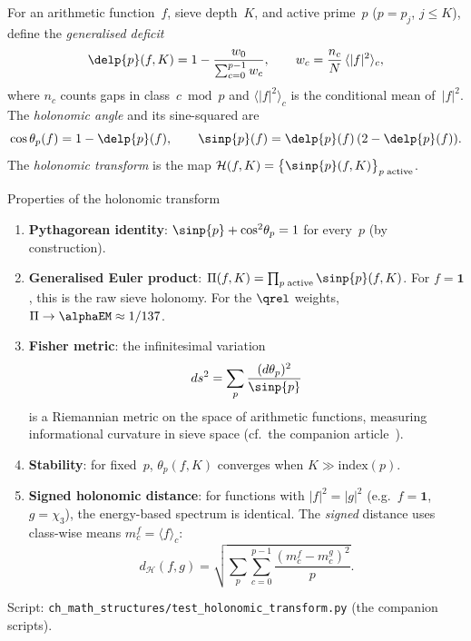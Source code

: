 \documentclass[12pt,a4paper]{article}
\begin{document}
\begin{definition}
\label{def:holonomic_transform}
For an arithmetic function~$f$, sieve depth~$K$, and active
prime~$p$ ($p = p_j$, $j \leq K$), define the \emph{generalised
deficit}
\begin{equation}
  \delp{p}(f,K) = 1 - \frac{w_0}{\sum_{c=0}^{p-1} w_c},
  \qquad
  w_c = \frac{n_c}{N}\,\langle |f|^2 \rangle_c,
  \label{eq:holonomic_deficit}
\end{equation}
where $n_c$ counts gaps in class~$c \bmod p$ and
$\langle |f|^2 \rangle_c$ is the conditional mean of~$|f|^2$.
The \emph{holonomic angle} and its sine-squared are
\begin{equation}
  \cos\theta_p(f) = 1 - \delp{p}(f),
  \qquad
  \sinp{p}(f) = \delp{p}(f)\,(2 - \delp{p}(f)).
  \label{eq:holonomic_angle}
\end{equation}
The \emph{holonomic transform} is the map
$\mathcal{H}(f,K) = \bigl\{\sinp{p}(f,K)\bigr\}_{p\;\text{active}}$.
\end{definition}

\begin{thmbox}{Properties of the holonomic transform}
\label{thm:holonomic_properties}
\begin{enumerate}[nosep]
\item \textbf{Pythagorean identity}: $\sinp{p} + \cos^2\!\theta_p = 1$
  for every~$p$ (by construction).
\item \textbf{Generalised Euler product}:
  $\Pi(f,K) = \prod_{p\;\text{active}} \sinp{p}(f,K)$.
  For $f = \mathbf{1}$, this is the raw sieve holonomy.
  For the $\qrel$ weights, $\Pi \to \alphaEM \approx 1/137$.
\item \textbf{Fisher metric}: the infinitesimal variation
  \begin{equation}
    ds^2 = \sum_p \frac{(d\theta_p)^2}{\sinp{p}}
    \label{eq:fisher_holonomic}
  \end{equation}
  is a Riemannian metric on the space of arithmetic functions,
  measuring informational curvature in sieve space
  (cf.~the companion article~\cite{companion_M2}).
\item \textbf{Stability}: for fixed~$p$, $\theta_p(f,K)$ converges
  when $K \gg \mathrm{index}(p)$.
\item \textbf{Signed holonomic distance}: for functions with
  $|f|^2 = |g|^2$ (e.g.\ $f = \mathbf{1}$, $g = \chi_3$),
  the energy-based spectrum is identical.  The \emph{signed}
  distance uses class-wise means $m_c^f = \langle f \rangle_c$:
  \begin{equation}
    d_{\mathcal{H}}(f,g)
    = \sqrt{\sum_p \sum_{c=0}^{p-1}
      \frac{(m_c^f - m_c^g)^2}{p}}.
    \label{eq:holonomic_distance}
  \end{equation}
\end{enumerate}
Script: \texttt{ch\_math\_structures/test\_holonomic\_transform.py}
(the companion scripts).
\end{thmbox}
\end{document}
